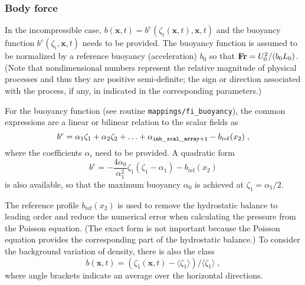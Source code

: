 \subsubsection{Body force}

In the incompressible case, $b(\mathbf{x},t)=b^e(\zeta_i(\mathbf{x},t),\mathbf{x},t)$ and the buoyancy function $b^e(\zeta_i,\mathbf{x},t)$ needs to be provided. The buoyancy function is assumed to be normalized by a reference buoyancy (acceleration) $b_0$ so that $\mathrm{\bf Fr}=U_0^2/(b_0L_0)$. (Note that nondimensional numbers represent the relative magnitude of physical processes and thus they are positive semi-definite; the sign or direction associated with the process, if any, in indicated in the corresponding parameters.)

For the buoyancy function (see routine {\tt mappings/fi\_buoyancy}), the common expressions are a linear or bilinear relation to the scalar fields as
\begin{equation}
    b^e=\alpha_1\zeta_1+\alpha_2\zeta_2+\ldots+\alpha_\mathrm{\tt inb\_scal\_array+1} -b_\mathrm{ref}(x_2)\;,
\end{equation}
where the coefficients $\alpha_i$ need to be provided. A quadratic form
\begin{equation}
    b^e=-\frac{4\alpha_0}{\alpha_1^2}\zeta_1(\zeta_1-\alpha_1) -b_\mathrm{ref}(x_2)
\end{equation}
is also available, so that the maximum buoyancy $\alpha_0$ is achieved at
$\zeta_1=\alpha_1/2$.

The reference profile $b_\mathrm{ref}(x_2)$ is used to remove the hydrostatic balance to leading order and reduce the numerical error when calculating the pressure from the Poisson equation. (The exact form is not important because the Poisson equation provides the corresponding part of the hydrostatic balance.) To consider the background variation of density, there is also the class
\begin{equation}
    b(\mathbf{x},t)=(\zeta_1(\mathbf{x},t)-\langle \zeta_1\rangle)/\langle \zeta_1\rangle \;,
\end{equation}
where angle brackets indicate an average over the horizontal directions.



